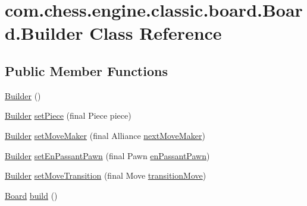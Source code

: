 \hypertarget{classcom_1_1chess_1_1engine_1_1classic_1_1board_1_1_board_1_1_builder}{}\section{com.\+chess.\+engine.\+classic.\+board.\+Board.\+Builder Class Reference}
\label{classcom_1_1chess_1_1engine_1_1classic_1_1board_1_1_board_1_1_builder}
\subsection*{Public Member Functions}
\begin{DoxyCompactItemize}
\item 
\mbox{\hyperlink{classcom_1_1chess_1_1engine_1_1classic_1_1board_1_1_board_1_1_builder_a08316ed69729303ec6dd3f293543b016}{Builder}} ()
\item 
\mbox{\hyperlink{classcom_1_1chess_1_1engine_1_1classic_1_1board_1_1_board_1_1_builder}{Builder}} \mbox{\hyperlink{classcom_1_1chess_1_1engine_1_1classic_1_1board_1_1_board_1_1_builder_af5f427825d6a80710cabee376dec64d8}{set\+Piece}} (final Piece piece)
\item 
\mbox{\hyperlink{classcom_1_1chess_1_1engine_1_1classic_1_1board_1_1_board_1_1_builder}{Builder}} \mbox{\hyperlink{classcom_1_1chess_1_1engine_1_1classic_1_1board_1_1_board_1_1_builder_ad7646b45a2ce8f1a4569aab6c587edad}{set\+Move\+Maker}} (final Alliance \mbox{\hyperlink{classcom_1_1chess_1_1engine_1_1classic_1_1board_1_1_board_1_1_builder_af066f86ebb23734e856e979d38c620bc}{next\+Move\+Maker}})
\item 
\mbox{\hyperlink{classcom_1_1chess_1_1engine_1_1classic_1_1board_1_1_board_1_1_builder}{Builder}} \mbox{\hyperlink{classcom_1_1chess_1_1engine_1_1classic_1_1board_1_1_board_1_1_builder_a88b23347fd476e6806b77b5949c5f382}{set\+En\+Passant\+Pawn}} (final Pawn \mbox{\hyperlink{classcom_1_1chess_1_1engine_1_1classic_1_1board_1_1_board_1_1_builder_ad1c27cc760e0a7676fc4c0061ddca3dc}{en\+Passant\+Pawn}})
\item 
\mbox{\hyperlink{classcom_1_1chess_1_1engine_1_1classic_1_1board_1_1_board_1_1_builder}{Builder}} \mbox{\hyperlink{classcom_1_1chess_1_1engine_1_1classic_1_1board_1_1_board_1_1_builder_a077946a91388813c151b8732469c492f}{set\+Move\+Transition}} (final Move \mbox{\hyperlink{classcom_1_1chess_1_1engine_1_1classic_1_1board_1_1_board_1_1_builder_aaf84641d4b0678158dc1128dd200a03c}{transition\+Move}})
\item 
\mbox{\hyperlink{classcom_1_1chess_1_1engine_1_1classic_1_1board_1_1_board}{Board}} \mbox{\hyperlink{classcom_1_1chess_1_1engine_1_1classic_1_1board_1_1_board_1_1_builder_aeafdcdd0955463d91a701298008fe24d}{build}} ()
\end{DoxyCompactItemize}
